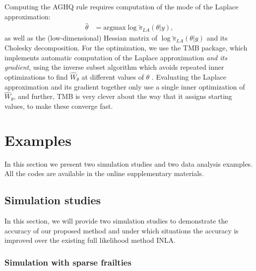 \documentclass[ba]{imsart}
\begin{document}
Computing the AGHQ rule requires computation of the mode of the Laplace approximation:
\begin{equation}\begin{aligned}
\widehat{\theta} &= \text{argmax}\log\widetilde{\pi}_{LA}(\theta|y),
\end{aligned}\end{equation}
as well as the (low-dimensional) Hessian matrix of $\log\widetilde{\pi}_{LA}(\theta|y)$ and its Cholesky decomposition. For the optimization, we use the TMB package, which implements automatic computation of the Laplace approximation \emph{and its gradient}, using the inverse subset algorithm which avoids repeated inner optimizations to find $\widehat{W}_{\theta}$ at different values of $\theta$ \citep{tmb}. Evaluating the Laplace approximation and its gradient together only use a single inner optimization of $\widehat{W}_{\theta}$, and further, TMB is very clever about the way that it assigns starting values, to make these converge fast.



\section{Examples}\label{sec:example}

In this section we present two simulation studies and two data analysis examples. All the codes are available in the online supplementary materials.

\subsection{Simulation studies}\label{subsec:sim}
In this section, we will provide two simulation studies to demonstrate the accuracy of our proposed method and under which situations the accuracy is improved over the existing full likelihood method INLA.

\subsubsection{Simulation with sparse frailties}\label{subsubsec:sim1}
\end{document}
